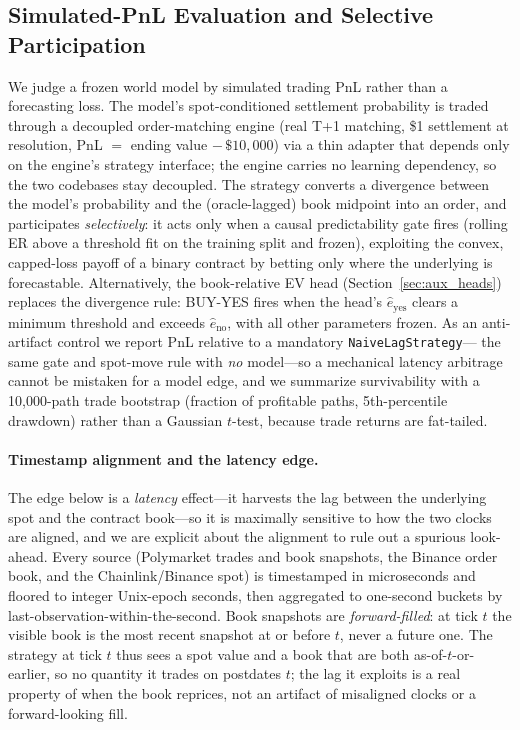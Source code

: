 \documentclass{article}
\begin{document}
\subsection{Simulated-PnL Evaluation and Selective Participation}\label{sec:pnl}

We judge a frozen world model by simulated trading PnL rather than a
forecasting loss.  The model's spot-conditioned settlement probability is
traded through a decoupled order-matching engine (real T+1 matching, \$1
settlement at resolution, PnL $=$ ending value $-\,\$10{,}000$) via a
thin adapter that depends only on the engine's strategy interface; the
engine carries no learning dependency, so the two codebases stay
decoupled.  The strategy converts a divergence between the model's
probability and the (oracle-lagged) book midpoint into an order, and
participates \emph{selectively}: it acts only when a causal predictability
gate fires (rolling ER above a threshold fit on the training split and
frozen), exploiting the convex, capped-loss payoff of a binary contract
by betting only where the underlying is forecastable.  Alternatively, the
book-relative EV head (Section~\ref{sec:aux_heads}) replaces the
divergence rule: BUY-YES fires when the head's $\hat{e}_\text{yes}$
clears a minimum threshold and exceeds $\hat{e}_\text{no}$, with all
other parameters frozen.  As an anti-artifact
control we report PnL relative to a mandatory \texttt{NaiveLagStrategy}---
the same gate and spot-move rule with \emph{no} model---so a mechanical
latency arbitrage cannot be mistaken for a model edge, and we summarize
survivability with a 10{,}000-path trade bootstrap (fraction of
profitable paths, 5th-percentile drawdown) rather than a Gaussian
$t$-test, because trade returns are fat-tailed.

\paragraph{Timestamp alignment and the latency edge.}
The edge below is a \emph{latency} effect---it harvests the lag between the
underlying spot and the contract book---so it is maximally sensitive to how
the two clocks are aligned, and we are explicit about the alignment to rule
out a spurious look-ahead.  Every source (Polymarket trades and book
snapshots, the Binance order book, and the Chainlink/Binance spot) is
timestamped in microseconds and floored to integer Unix-epoch seconds, then
aggregated to one-second buckets by last-observation-within-the-second.  Book
snapshots are \emph{forward-filled}: at tick $t$ the visible book is the most
recent snapshot at or before $t$, never a future one.  The strategy at tick
$t$ thus sees a spot value and a book that are both as-of-$t$-or-earlier, so
no quantity it trades on postdates $t$; the lag it exploits is a real property
of when the book reprices, not an artifact of misaligned clocks or a
forward-looking fill.
\end{document}
